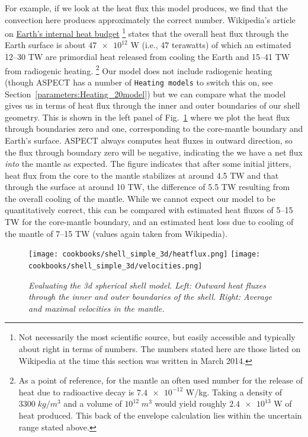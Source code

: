 \documentclass{article}
\newcommand{\aspect}{\textsc{ASPECT}}
\begin{document}
For example, if we look at the heat flux this model produces, we find that the
convection here produces approximately the correct number. Wikipedia's article
on \href{http://en.wikipedia.org/wiki/Earth's_internal_heat_budget}{Earth's
internal heat budget}%
\footnote{Not necessarily the most scientific source, but easily
accessible and typically about right in terms of numbers. The numbers stated
here are those listed on Wikipedia at the time this section was written in
March 2014.}
states that the overall heat flux through the Earth surface is about $\num{47e12}$ W (i.e., 47 terawatts) of which an estimated 12--30 TW are primordial
heat released from cooling the Earth and 15--41 TW from radiogenic heating.%
\footnote{As a point of reference, for the mantle an often used number for the
release of heat due to radioactive decay is $\num{7.4e-12}$ W/kg. Taking a
density of $3300\; \si{kg}/\si{m}^3$ and a volume of $10^{12}\; \si{m}^3$
would yield roughly $\num{2.4e13}$ W of heat produced. This back of the
envelope calculation lies within the uncertain range stated above.}
Our model does not include radiogenic heating (though \aspect{} has a number of 
\texttt{Heating models} to switch this on, see 
Section~\ref{parameters:Heating_20model}) but we can compare what the model
gives us in terms of heat flux through the inner and outer boundaries of our
shell geometry. This is shown in the left panel of
Fig.~\ref{fig:shell-simple-3d-eval} where we plot the heat flux through
boundaries zero and one, corresponding to the core-mantle boundary and Earth's
surface. \aspect{} always computes heat fluxes in outward direction, so the flux
through boundary zero will be negative, indicating the we have a net flux
\textit{into} the mantle as expected. The figure indicates that after some
initial jitters, heat flux from the core to the mantle stabilizes at around 4.5
TW and that through the surface at around 10 TW, the difference of 5.5 TW
resulting from the overall cooling of the mantle. While we cannot expect our model to be
quantitatively correct, this can be compared with estimated heat fluxes of 5--15
TW for the core-mantle boundary, and an estimated heat loss due to cooling of
the mantle of 7--15 TW (values again taken from Wikipedia).

\begin{figure}
  \texttt{[image: cookbooks/shell\_simple\_3d/heatflux.png]}
  \hfill
  \texttt{[image: cookbooks/shell\_simple\_3d/velocities.png]}
  \caption{\it Evaluating the 3d spherical shell model. Left: Outward heat
  fluxes through the inner and outer boundaries of the shell. Right: Average
  and maximal velocities in the mantle.}
  \label{fig:shell-simple-3d-eval}
\end{figure}
\end{document}
